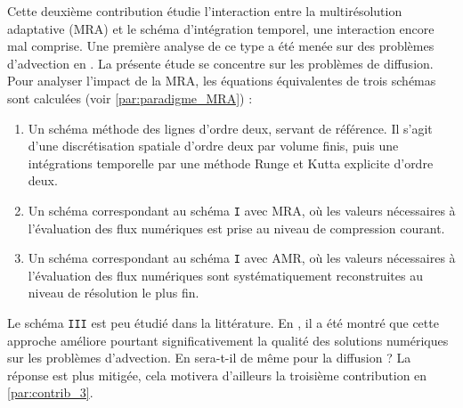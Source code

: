 Cette deuxième contribution étudie l'interaction entre la multirésolution adaptative (MRA) et le schéma d'intégration temporel, 
une interaction encore mal comprise. 
Une première analyse de ce type a été menée sur des problèmes d'advection en \cite{belloti_et_al_2025}. 
La présente étude se concentre sur les problèmes de diffusion. 
Pour analyser l'impact de la MRA, les équations équivalentes de trois schémas sont calculées (voir \ref{par:paradigme_MRA}) :

\begin{enumerate}
    \renewcommand{\labelenumi}{\Roman{enumi}.}
    \item Un schéma méthode des lignes d'ordre deux, servant de référence. Il s'agit d'une discrétisation spatiale d'ordre deux par volume finis, 
    puis une intégrations temporelle par une méthode Runge et Kutta explicite d'ordre deux.
    \item Un schéma correspondant au schéma \texttt{I} avec MRA, où les valeurs nécessaires à l'évaluation des flux numériques 
    est prise au niveau de compression courant.
    \item Un schéma correspondant au schéma \texttt{I} avec AMR, où les valeurs nécessaires à l'évaluation des flux numériques 
    sont systématiquement reconstruites au niveau de résolution le plus fin.
\end{enumerate}
Le schéma \texttt{III} est peu étudié dans la littérature.
En \cite{belloti_et_al_2025}, il a été montré que cette approche améliore pourtant significativement la qualité des solutions numériques sur les problèmes d'advection.
En sera-t-il de même pour la diffusion ? La réponse est plus mitigée, cela motivera d'ailleurs la troisième contribution en \ref{par:contrib_3}.